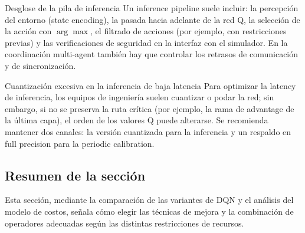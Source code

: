 \begin{knowledgebox}{Desglose de la pila de inferencia}
Un inference pipeline suele incluir: la percepción del entorno (state encoding), la pasada hacia adelante de la red Q, la selección de la acción con $\arg\max$, el filtrado de acciones (por ejemplo, con restricciones previas) y las verificaciones de seguridad en la interfaz con el simulador. En la coordinación multi-agent también hay que controlar los retrasos de comunicación y de sincronización.
\end{knowledgebox}

\begin{warningbox}{Cuantización excesiva en la inferencia de baja latencia}
Para optimizar la latency de inferencia, los equipos de ingeniería suelen cuantizar o podar la red; sin embargo, si no se preserva la ruta crítica (por ejemplo, la rama de advantage de la última capa), el orden de los valores Q puede alterarse. Se recomienda mantener dos canales: la versión cuantizada para la inferencia y un respaldo en full precision para la periodic calibration.
\end{warningbox}

\subsection{Resumen de la sección}

Esta sección, mediante la comparación de las variantes de DQN y el análisis del modelo de costos, señala cómo elegir las técnicas de mejora y la combinación de operadores adecuadas según las distintas restricciones de recursos.

